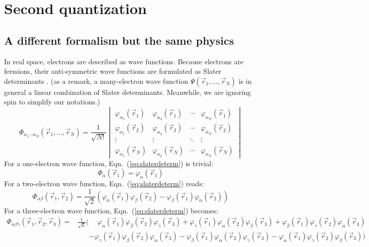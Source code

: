 \chapter{Second quantization} \label{app:B}

\section{A different formalism but the same physics}
In real space, electrons are described as wave functions.
Because electrons are fermions, their anti-symmetric wave functions are
formulated as Slater determinants \cite{GBK}. (as a remark, a many-electron wave function
$\Psi(\vec{r}_1,\ldots,\vec{r}_N)$ is in general a linear combination
of Slater determinants. Meanwhile, we are ignoring spin to simplify our notations.)
\begin{equation} \label{eq:slaterdeterm}
\Phi_{\alpha_1\cdots\alpha_N}(\vec{r}_1,\ldots,\vec{r}_N) = \frac{1}{\sqrt{N!}}
\begin{vmatrix}
\varphi_{\alpha_1}(\vec{r}_1) & \varphi_{\alpha_2}(\vec{r}_1) & \cdots & \varphi_{\alpha_N}(\vec{r}_1) \\
\varphi_{\alpha_1}(\vec{r}_2) & \varphi_{\alpha_2}(\vec{r}_2) & \cdots & \varphi_{\alpha_N}(\vec{r}_2) \\
\vdots & \vdots & \ddots & \vdots \\
\varphi_{\alpha_1}(\vec{r}_N) & \varphi_{\alpha_2}(\vec{r}_N) & \cdots & \varphi_{\alpha_N}(\vec{r}_N)
\end{vmatrix}
\end{equation}
%
For a one-electron wave function, Eqn.~(\ref{eq:slaterdeterm}) is trivial:
\begin{equation}
\Phi_\alpha(\vec{r}_1) = \varphi_\alpha(\vec{r}_1)
\end{equation}
%
For a two-electron wave function, Eqn.~(\ref{eq:slaterdeterm}) reads:
\begin{equation}
\Phi_{\alpha\beta}(\vec{r}_1,\vec{r}_2) = \frac{1}{\sqrt{2}}(\varphi_\alpha(\vec{r}_1)\varphi_\beta(\vec{r}_2)
- \varphi_\beta(\vec{r}_1)\varphi_\alpha(\vec{r}_2))
\end{equation}
%
For a three-electron wave function, Eqn.~(\ref{eq:slaterdeterm}) becomes:
\begin{align} \label{eq:3SD}
\Phi_{\alpha\beta\gamma}(\vec{r}_1,\vec{r}_2,\vec{r}_3) = & {} \frac{1}{\sqrt{6}}
\Big(\phantom{-}\varphi_\alpha(\vec{r}_1)\varphi_\beta(\vec{r}_2)\varphi_\gamma(\vec{r}_3)
+ \varphi_\gamma(\vec{r}_1)\varphi_\alpha(\vec{r}_2)\varphi_\beta(\vec{r}_3)
+ \varphi_\beta(\vec{r}_1)\varphi_\gamma(\vec{r}_2)\varphi_\alpha(\vec{r}_3) \nonumber \\
& {} \phantom{\frac{1}{\sqrt{6}}(} {-\varphi_\gamma(\vec{r}_1)}\varphi_\beta(\vec{r}_2)\varphi_\alpha(\vec{r}_3)
- \varphi_\beta(\vec{r}_1)\varphi_\alpha(\vec{r}_2)\varphi_\gamma(\vec{r}_3)
- \varphi_\alpha(\vec{r}_1)\varphi_\gamma(\vec{r}_2)\varphi_\beta(\vec{r}_3) \Big)
\end{align}
